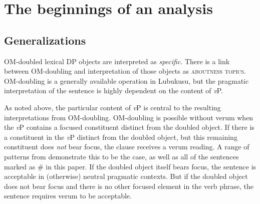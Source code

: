 \documentclass[output=paper]{langscibook}
\begin{document}





\section{The beginnings of an analysis} \label{SectAnalysis}

\subsection{Generalizations}\largerpage

\ea 
  \begin{xlist}
  \ex OM-doubled lexical DP objects are interpreted as \textit{specific}.  
  \ex There is a link between OM-doubling and interpretation of those objects as \textsc{aboutness topics}.
  \ex OM-doubling is a generally available operation in Lubukusu, but the pragmatic interpretation of the sentence is highly dependent on the content of \textit{v}P. 
  \end{xlist}
\z 

As noted above, the particular content of \textit{v}P is central to the resulting interpretations from OM-doubling. OM-doubling is possible without verum when the \textit{v}P contains a focused constituent distinct from the doubled object. If there is a constituent in the \textit{v}P distinct from the doubled object, but this remaining constituent does \textit{not} bear focus, the clause receives a verum reading. A range of patterns from \citealt{SikukuEtAl:2018:LubukusuOM} demonstrate this to be the case, as well as all of the sentences marked as \# in this paper. If the doubled object itself bears focus, the sentence is acceptable in (otherwise) neutral pragmatic contexts. But if the doubled object does not bear focus and there is no other focused element in the verb phrase, the sentence requires verum to be acceptable.
\end{document}
